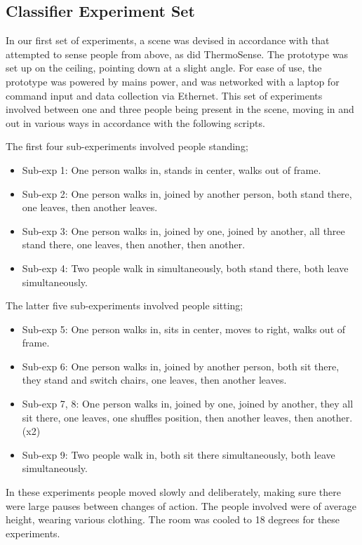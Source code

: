 \documentclass[../thesis/thesis.tex]{subfiles}
\begin{document}
\subsection{Classifier Experiment Set}
In our first set of experiments, a scene was devised in accordance with  that attempted to sense people from above, as did ThermoSense. The prototype was set up on the ceiling, pointing down at a slight angle. For ease of use, the prototype was powered by mains power, and was networked with a laptop for command input and data collection via Ethernet. This set of experiments involved between one and three people being present in the scene, moving in and out in various ways in accordance with the following scripts.

The first four sub-experiments involved people standing;
\begin{itemize}
\item Sub-exp 1: One person walks in, stands in center, walks out of frame.
\item Sub-exp 2: One person walks in, joined by another person, both stand there, one leaves, then another leaves.
\item Sub-exp 3: One person walks in, joined by one, joined by another, all three stand there, one leaves, then another, then another.
\item Sub-exp 4: Two people walk in simultaneously, both stand there, both leave simultaneously.
\end{itemize}

The latter five sub-experiments involved people sitting;
\begin{itemize}
\item Sub-exp 5: One person walks in, sits in center, moves to right, walks out of frame.
\item Sub-exp 6: One person walks in, joined by another person, both sit there, they stand and switch chairs, one leaves, then another leaves.
\item Sub-exp 7, 8: One person walks in, joined by one, joined by another, they all sit there, one leaves, one shuffles position, then another leaves, then another. (x2)
\item Sub-exp 9: Two people walk in, both sit there simultaneously, both leave simultaneously.
\end{itemize}

In these experiments people moved slowly and deliberately, making sure there were large pauses between changes of action. The people involved were of average height, wearing various clothing. The room was cooled to 18 degrees for these experiments.
\end{document}
